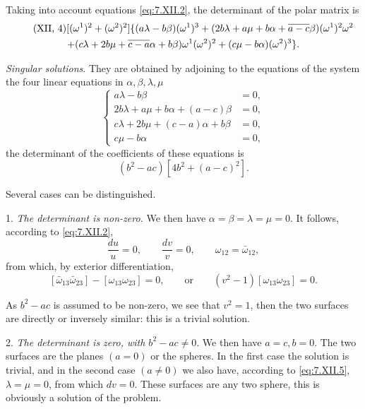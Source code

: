 \documentclass[leqno,11pt]{book}
\numberwithin{equation}{chapter}
\theoremstyle{shape1}
\theoremstyle{shape0}
\theoremstyle{shape2}
\theoremstyle{definition}
\begin{document}
Taking into account equations \eqref{eq:7.XII.2}, the determinant of the polar matrix is
\begin{gather}
  \label{eq:7.XII.4}\tag{XII, 4}
  [(\omega^{1})^{2}+(\omega^{2})^{2}]\{(a\lambda-b\beta)(\omega^{1})^{3}+(2b\lambda+a\mu+b\alpha+\overline{a-c}\beta)(\omega^{1})^{2}\omega^{2}\\
  +(c\lambda+2b\mu+\overline{c-a}\alpha+b\beta)\omega^{1}(\omega^{2})^{2}+(c\mu-b\alpha)(\omega^{2})^{3}\}.\notag
\end{gather}


\vspace{12pt}\fsec\emph{Singular solutions}. They are obtained by adjoining to the equations of the system the four linear equations in $\alpha,\beta,\lambda,\mu$
\begin{equation}
  \label{eq:7.XII.5}\tag{XII, 5}
  \left\{
    \begin{aligned}
      a\lambda-b\beta&=0,\\
      2b\lambda+a\mu+b\alpha+(a-c)\beta&=0,\\
      c\lambda+2b\mu+(c-a)\alpha+b\beta&=0,\\
      c\mu-b\alpha&=0,
    \end{aligned}
  \right.
\end{equation}
the determinant of the coefficients of these equations is
\[
(b^{2}-ac)[4b^{2}+(a-c)^{2}].
\]

Several cases can be distinguished.

1. \emph{The determinant is non-zero.} We then have $\alpha=\beta=\lambda=\mu=0$. It follows, according to \eqref{eq:7.XII.2},
\[
\frac{du}{u}=0,\qquad\frac{dv}{v}=0,\qquad\omega_{12}=\bar\omega_{12},
\]
from which, by exterior differentiation,
\[
[\bar\omega_{13}\bar\omega_{23}]-[\omega_{13}\omega_{23}]=0,\qquad\text{or}\qquad(v^{2}-1)[\omega_{13}\omega_{23}]=0.
\]

As $b^{2}-ac$ is assumed to be non-zero, we see that $v^{2}=1$, then the two surfaces are directly or inversely similar: this is a trivial solution.

2. \emph{The determinant is zero, with $b^{2}-ac\neq0$}. We then have $a=c,b=0$. The two surfaces are the planes $(a=0)$ or the spheres. In the first case the solution is trivial, and in the second case $(a\neq 0)$ we also have, according to \eqref{eq:7.XII.5}, $\lambda=\mu=0$, from which $dv=0$. These surfaces are any two sphere, this is obviously a solution of the problem.
\end{document}

